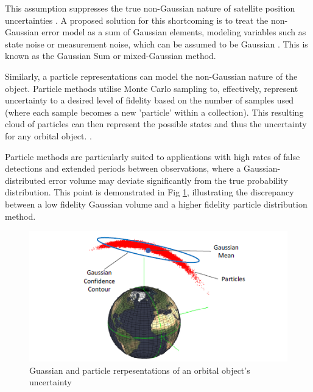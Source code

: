 \documentclass[12pt,openany,a4paper]{book}
\begin{document}
		This assumption suppresses the true non-Gaussian nature of satellite position uncertainties \cite{Hobson, Ghrist}. A proposed solution for this shortcoming is to treat the non-Gaussian error model as a sum of Gaussian elements, modeling variables such as state noise or measurement noise, which can be assumed to be Gaussian \cite{Jiajun, Terajanu}. This is known as the Gaussian Sum or mixed-Gaussian method. \newline 
		
		
		Similarly, a particle representations can model the non-Gaussian nature of the object. Particle methods utilise Monte Carlo sampling to, effectively, represent uncertainty to a desired level of fidelity based on the number of samples used (where each sample becomes a new 'particle' within a collection). This resulting cloud of particles can then represent the possible states and thus the uncertainty for any orbital object. \cite{Hobson}. \newline
		
		Particle methods are particularly suited to applications with high rates of false detections and extended periods between observations, where a Gaussian-distributed error volume may deviate significantly from the true probability distribution. This point is demonstrated in Fig \ref{guass}, illustrating the discrepancy between a low fidelity Gaussian volume and a higher fidelity particle distribution method. \newline 
		
		\begin{figure}[H]
			\centering
			\caption{Guassian and particle rerpesentations of an orbital object's uncertainty}
			\label{guass}
			\includegraphics[scale=0.8]{guass.png}
		\end{figure}
		
\end{document}
